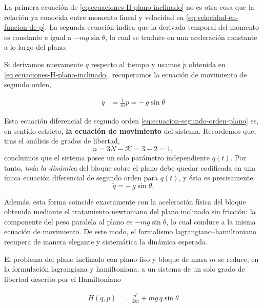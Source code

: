 \documentclass{article}
\begin{document}
La primera ecuación de \eqref{eq:ecuaciones-H-plano-inclinado} no es otra cosa que
la relación ya conocida entre momento lineal y velocidad en
\eqref{eq:velocidad-en-funcion-de-p}.  
La segunda ecuación indica que la derivada temporal del momento es constante e igual
a \(-m g\sin\theta\), lo cual se traduce en una aceleración constante a lo largo
del plano.

Si derivamos nuevamente \(\dot q\) respecto al tiempo y usamos \(\dot p\) obtenida en
\eqref{eq:ecuaciones-H-plano-inclinado}, recuperamos la ecuación de movimiento de
segundo orden,

\begin{equation}
\begin{split}
\ddot q
&= \frac{1}{m}\dot p
 = -\,g\sin\theta
\end{split}\label{eq:ecuacion-segundo-orden-plano}
\end{equation}

Esta ecuación diferencial de segundo orden \eqref{eq:ecuacion-segundo-orden-plano}
es, en sentido estricto, \textbf{la ecuación de movimiento} del sistema.
Recordemos que, tras el análisis de grados de libertad,
\[
n = 3N - \mathcal{K} = 3 - 2 = 1,
\]
concluimos que el sistema posee un solo parámetro independiente \(q(t)\).
Por tanto, \emph{toda la dinámica} del bloque sobre el plano debe quedar codificada
en una única ecuación diferencial de segundo orden para \(q(t)\), y ésta es
precisamente
\[
\ddot q = -\,g\sin\theta.
\]

Además, esta forma coincide exactamente con la aceleración física del bloque
obtenida mediante el tratamiento newtoniano del plano inclinado sin fricción:
la componente del peso paralela al plano es \(-mg\sin\theta\), lo cual conduce a
la misma ecuación de movimiento. De este modo, el formalismo lagrangiano–hamiltoniano
recupera de manera elegante y sistemática la dinámica esperada.


\vspace{0.4cm}

El problema del plano inclinado con plano liso y bloque de masa
\(m\) se reduce, en la formulación lagrangiana y hamiltoniana, a un sistema de un
solo grado de libertad descrito por el Hamiltoniano

\begin{equation}
\begin{split}
H(q,p)
&= \frac{p^{2}}{2m} + m g\,q\sin\theta
\end{split}\label{eq:H-plano-inclinado-resumen}
\end{equation}
\end{document}
